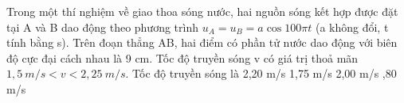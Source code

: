 \begin{vidu}%
Trong một thí nghiệm về giao thoa sóng nước, hai nguồn sóng kết hợp được đặt tại A và B dao động theo phương trình $u_A = u_B = a\cos100\pi t$ (a không đổi, t tính bằng s). Trên đoạn thẳng AB, hai điểm có phần tử nước dao động với biên độ cực đại cách nhau là 9 cm. Tốc độ truyền sóng v có giá trị thoả mãn $1,5\ m/s < v < 2,25\ m/s$. Tốc độ truyền sóng là
\choice
{2,20 m/s}
{1,75 m/s}
{2,00 m/s}
{,80 m/s}
\end{vidu} %



